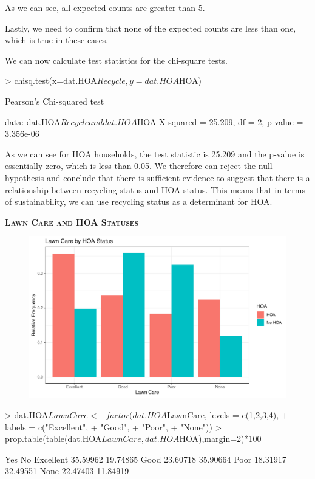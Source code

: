 \documentclass{article}
\begin{document}
As we can see, all expected counts are greater than 5.

Lastly, we need to confirm that none of the expected counts are less than one, which is true in these cases. 

We can now calculate test statistics for the chi-square tests. 
\begin{Schunk}
\begin{Sinput}
> chisq.test(x=dat.HOA$Recycle,y=dat.HOA$HOA)
\end{Sinput}
\begin{Soutput}
	Pearson's Chi-squared test

data:  dat.HOA$Recycle and dat.HOA$HOA
X-squared = 25.209, df = 2, p-value = 3.356e-06
\end{Soutput}
\end{Schunk}

As we can see for HOA households, the test statistic is 25.209 and the p-value is essentially zero, which is less than 0.05. We therefore can reject the null hypothesis and conclude that there is sufficient evidence to suggest that there is a relationship between recycling status and HOA status. This means that in terms of sustainability, we can use recycling status as a determinant for HOA.

\newpage
\textsc{\textbf{Lawn Care and HOA Statuses}}
\newline
\newline
\begin{figure}[H]
		\centering
\includegraphics{exam23-014}
		\label{Fig:plot4}
	\end{figure}
\begin{Schunk}
\begin{Sinput}
> dat.HOA$LawnCare<-factor(dat.HOA$LawnCare, levels = c(1,2,3,4),
+                         labels = c("Excellent",
+                         "Good",
+                         "Poor",
+                         "None"))
> prop.table(table(dat.HOA$LawnCare, dat.HOA$HOA),margin=2)*100
\end{Sinput}
\begin{Soutput}
                 Yes       No
  Excellent 35.59962 19.74865
  Good      23.60718 35.90664
  Poor      18.31917 32.49551
  None      22.47403 11.84919
\end{Soutput}
\end{Schunk}
\end{document}
